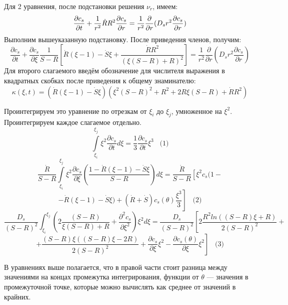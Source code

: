 \par Для 2 уравнения, после подстановки решения $\nu_{r}$, имеем:\\
$$\displaystyle \frac{\partial c_{s}}{\partial t}+\frac{1}{r^{2}}\dot{R}R^{2}\frac{\partial c_{s}}{\partial r}=\frac{1}{r^{2}}\frac{\partial}{\partial r}(D_{s}r^{2}\frac{\partial c_{s}}{\partial r})$$
Выполним вышеуказанную подстановку. После приведения членов, получим:
$$\frac{\partial c_{s}}{\partial t}+\frac{\partial c_{s}}{\partial \xi}\frac{1}{S-R}\left[\dot{R}(\xi-1)-\dot{S}\xi+\frac{\dot{R}R^{2}}{(\xi(S-R)+R)^{2}}\right]=\frac{1}{r^{2}}\frac{\partial}{\partial r}(D_{s}r^{2}\frac{\partial c_{s}}{\partial r})$$
Для второго слагаемого введём обозначение для числителя выражения в квадратных скобках после приведения к общему знаминателю:
$$\kappa(\xi,t)=\left(\dot{R}(\xi-1)-\dot{S}\xi\right)\left(\xi^{2}(S-R)^{2}+R^{2}+2R\xi(S-R)+\dot{R}R^{2}\right)$$
\par Проинтегрируем это уравнение по отрезкам от $\xi_{i}$ до $\xi_{j}$, умноженное на $\xi^{2}$. Проинтегрируем каждое слагаемое отдельно.
$$\int\limits^{\xi_{j}}_{\xi_{i}}\xi^{2}\frac{\partial c_{s}}{\partial t}d\xi=\frac{1}{3}\frac{\partial c_{s}}{\partial t}\xi^{3}\;\;\;\text{(1)}$$
$$\frac{\dot{R}}{S-R}\int\limits^{\xi_{j}}_{\xi_{i}}\xi^{2}\frac{\partial c_{s}}{\partial \xi}\left(\frac{1-\dot{R}(\xi-1)-\dot{S}\xi}{S-R}\right)d\xi=\frac{\dot{R}}{S-R}\left[\xi^{2}c_{s}(1-\right.$$
$$\left.-\dot{R}(\xi-1)-\dot{S}\xi)+(\dot{R}+\dot{S})c_{s}(\theta)\frac{\xi^{3}}{3}\right]\;\;\;\text{(2)}$$
$$\frac{D_{s}}{(S-R)^{2}}\int^{\xi_{j}}_{\xi_{i}}\left(2\frac{(S-R)}{\xi(S-R)+R}+\frac{\partial^{2} c_{s}}{\partial \xi^{2}}\right)\xi^{2}d\xi=\frac{D_{s}}{(S-R)^{2}}\left[2\frac{R^{2}ln\left((S-R)\xi+R\right)}{2(S-R)^{2}}+\right.$$
$$+\left.\frac{(S-R)\xi((S-R)\xi-2R)}{2(S-R)^{2}}+\frac{\partial c_{s}}{\partial \xi}\xi^{2}-\frac{\partial c_{s}(\theta)}{\partial \xi}\xi^{2}\right]\;\;\;\text{(3)}$$
\par В уравнениях выше полагается, что в правой части стоит разница между значениями на концах промежутка интегрирования, функции от $\theta$ --- значения в промежуточной точке, которые можно вычислять как среднее от значений в крайних.

